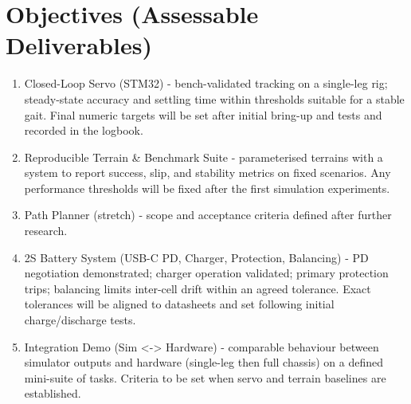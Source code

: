 \documentclass[a4paper,11pt]{article}
\newcommand{\resetganttwidth}{%
  \setlength{\gchartwidth}{\dimexpr\linewidth-\glabelwidth\relax}%
  \ganttset{expand chart=\gchartwidth}%
}
\def\({}%
\def\){}%
\def\leftrightarrow{<->}%
\begin{document}
\section{Objectives (Assessable Deliverables)}
\begin{enumerate}[nosep,label=\textbf{O\arabic*}]
  \item Closed-Loop Servo (STM32) - bench-validated tracking on a single-leg rig; steady-state accuracy and settling time within thresholds suitable for a stable gait. Final numeric targets will be set after initial bring-up and tests and recorded in the logbook.
  \item Reproducible Terrain \& Benchmark Suite - parameterised terrains with a system to report success, slip, and stability metrics on fixed scenarios. Any performance thresholds will be fixed after the first simulation experiments.
  \item Path Planner (stretch) - scope and acceptance criteria defined after further research.
  \item 2S Battery System (USB-C PD, Charger, Protection, Balancing) - PD negotiation demonstrated; charger operation validated; primary protection trips; balancing limits inter-cell drift within an agreed tolerance. Exact tolerances will be aligned to datasheets and set following initial charge/discharge tests.
  \item Integration Demo (Sim \(\leftrightarrow\) Hardware) - comparable behaviour between simulator outputs and hardware (single-leg then full chassis) on a defined mini-suite of tasks. Criteria to be set when servo and terrain baselines are established.
\end{enumerate}

\setlength{\glabelwidth}{4cm} %
\resetganttwidth





\end{document}
